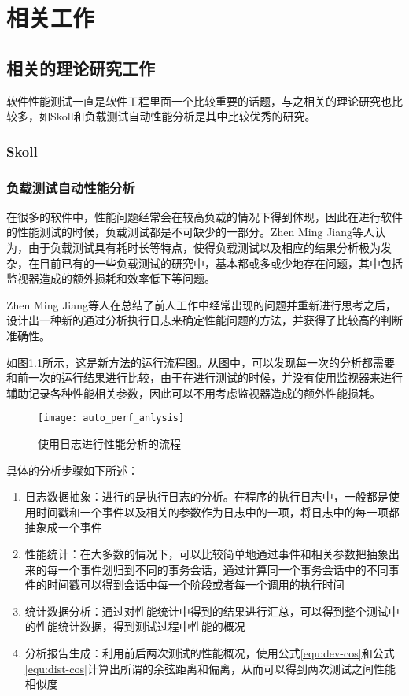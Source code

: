 
\chapter{相关工作}

\section{相关的理论研究工作}

软件性能测试一直是软件工程里面一个比较重要的话题，与之相关的理论研究也比较多，如Skoll\cite{schmidt2001leveraging}和负载测试自动性能分析\cite{Jiang:2010:AAL:1831708.1831726}是其中比较优秀的研究。

\subsection{Skoll}



\subsection{负载测试自动性能分析}

在很多的软件中，性能问题经常会在较高负载的情况下得到体现，因此在进行软件的性能测试的时候，负载测试都是不可缺少的一部分。Zhen Ming Jiang等人认为，由于负载测试具有耗时长等特点，使得负载测试以及相应的结果分析极为发杂，在目前已有的一些负载测试的研究中，基本都或多或少地存在问题，其中包括监视器造成的额外损耗和效率低下等问题。

Zhen Ming Jiang等人在总结了前人工作中经常出现的问题并重新进行思考之后，设计出一种新的通过分析执行日志来确定性能问题的方法，并获得了比较高的判断准确性。

如图\ref{fig:auto_perf_anlysis}所示，这是新方法的运行流程图。从图中，可以发现每一次的分析都需要和前一次的运行结果进行比较，由于在进行测试的时候，并没有使用监视器来进行辅助记录各种性能相关参数，因此可以不用考虑监视器造成的额外性能损耗。


\begin{figure}[H]
\centering
\texttt{[image: auto\_perf\_anlysis]}
\caption{使用日志进行性能分析的流程}
\label{fig:auto_perf_anlysis}
\end{figure}


具体的分析步骤如下所述：

\begin{enumerate}
\item 日志数据抽象：进行的是执行日志的分析。在程序的执行日志中，一般都是使用时间戳和一个事件以及相关的参数作为日志中的一项，将日志中的每一项都抽象成一个事件
\item 性能统计：在大多数的情况下，可以比较简单地通过事件和相关参数把抽象出来的每一个事件划归到不同的事务会话，通过计算同一个事务会话中的不同事件的时间戳可以得到会话中每一个阶段或者每一个调用的执行时间
\item 统计数据分析：通过对性能统计中得到的结果进行汇总，可以得到整个测试中的性能统计数据，得到测试过程中性能的概况
\item 分析报告生成：利用前后两次测试的性能概况，使用公式\ref{equ:dev-cos}和公式\ref{equ:dist-cos}计算出所谓的余弦距离和偏离，从而可以得到两次测试之间性能相似度
\end{enumerate}

